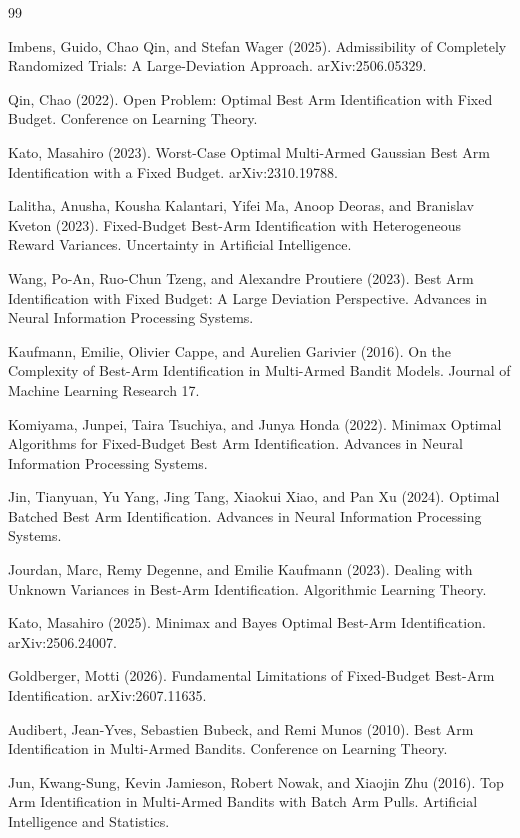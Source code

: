 \documentclass{article}
\begin{document}
\begin{thebibliography}{99}

   Imbens, Guido, Chao Qin, and Stefan Wager (2025). Admissibility of Completely Randomized Trials: A Large-Deviation Approach. arXiv:2506.05329.

   Qin, Chao (2022). Open Problem: Optimal Best Arm Identification with Fixed Budget. Conference on Learning Theory.

   Kato, Masahiro (2023). Worst-Case Optimal Multi-Armed Gaussian Best Arm Identification with a Fixed Budget. arXiv:2310.19788.

   Lalitha, Anusha, Kousha Kalantari, Yifei Ma, Anoop Deoras, and Branislav Kveton (2023). Fixed-Budget Best-Arm Identification with Heterogeneous Reward Variances. Uncertainty in Artificial Intelligence.

   Wang, Po-An, Ruo-Chun Tzeng, and Alexandre Proutiere (2023). Best Arm Identification with Fixed Budget: A Large Deviation Perspective. Advances in Neural Information Processing Systems.

   Kaufmann, Emilie, Olivier Cappe, and Aurelien Garivier (2016). On the Complexity of Best-Arm Identification in Multi-Armed Bandit Models. Journal of Machine Learning Research 17.

   Komiyama, Junpei, Taira Tsuchiya, and Junya Honda (2022). Minimax Optimal Algorithms for Fixed-Budget Best Arm Identification. Advances in Neural Information Processing Systems.

   Jin, Tianyuan, Yu Yang, Jing Tang, Xiaokui Xiao, and Pan Xu (2024). Optimal Batched Best Arm Identification. Advances in Neural Information Processing Systems.

   Jourdan, Marc, Remy Degenne, and Emilie Kaufmann (2023). Dealing with Unknown Variances in Best-Arm Identification. Algorithmic Learning Theory.

   Kato, Masahiro (2025). Minimax and Bayes Optimal Best-Arm Identification. arXiv:2506.24007.

   Goldberger, Motti (2026). Fundamental Limitations of Fixed-Budget Best-Arm Identification. arXiv:2607.11635.

   Audibert, Jean-Yves, Sebastien Bubeck, and Remi Munos (2010). Best Arm Identification in Multi-Armed Bandits. Conference on Learning Theory.

   Jun, Kwang-Sung, Kevin Jamieson, Robert Nowak, and Xiaojin Zhu (2016). Top Arm Identification in Multi-Armed Bandits with Batch Arm Pulls. Artificial Intelligence and Statistics.

\end{thebibliography}
\end{document}
